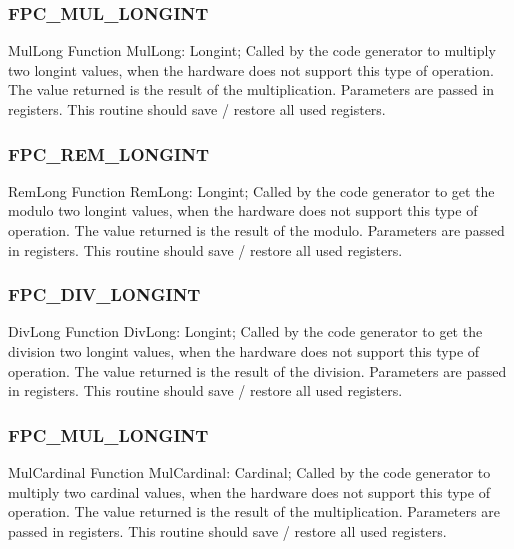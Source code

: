 \documentclass [a4paper,12pt]{article}
\begin{document}
\subsubsection{FPC{\_}MUL{\_}LONGINT}
\label{subsubsec:mylabel103}

\begin{function}{MulLong}
\Declaration
Function MulLong: Longint;
\Description
Called by the code generator to multiply two longint values, when the hardware does not support this type of operation. The value returned is the result of the multiplication.
\Parameters
Parameters are passed in registers.
\Notes
This routine should save / restore all used registers.
\end{function}

\subsubsection{FPC{\_}REM{\_}LONGINT}
\label{subsubsec:mylabel104}

\begin{function}{RemLong}
\Declaration
Function RemLong: Longint;
\Description
Called by the code generator to get the modulo two longint values, when the
hardware does not support this type of operation. The value returned is the
result of the modulo.
\Parameters
Parameters are passed in registers.
\Notes
This routine should save / restore all used registers.
\end{function}

\subsubsection{FPC{\_}DIV{\_}LONGINT}
\label{subsubsec:mylabel105}

\begin{function}{DivLong}
\Declaration
Function DivLong: Longint;
\Description
Called by the code generator to get the division two longint values, when
the hardware does not support this type of operation. The value returned is
the result of the division.
\Parameters
Parameters are passed in registers.
\Notes
This routine should save / restore all used registers.
\end{function}

\subsubsection{FPC{\_}MUL{\_}LONGINT}
\label{subsubsec:mylabel106}

\begin{function}{MulCardinal}
\Declaration
Function MulCardinal: Cardinal;
\Description
Called by the code generator to multiply two cardinal values, when the
hardware does not support this type of operation. The value returned is the
result of the multiplication.
\Parameters
Parameters are passed in registers.
\Notes
This routine should save / restore all used registers.
\end{function}
\end{document}
